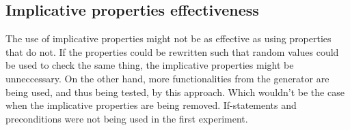 \subsection*{Implicative properties effectiveness}
The use of implicative properties might not be as effective as using properties that do not. If the properties could be rewritten such that random values could be used to check the same thing, the implicative properties might be unneccessary. On the other hand, more functionalities from the generator are being used, and thus being tested, by this approach. Which wouldn't be the case when the implicative properties are being removed. If-statements and preconditions were not being used in the first experiment.



